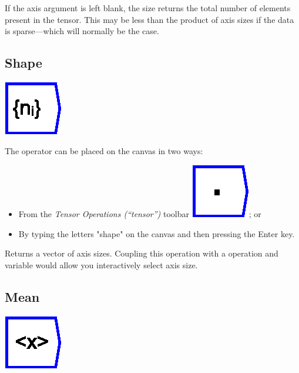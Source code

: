If the axis argument is left blank, the size returns the total number
of elements present in the tensor. This may be less than the product
of axis sizes if the data is sparse---which will normally be the
case.

\subsection{Shape}

\label{Operation:shape}

\includegraphics{images/shape}

The operator can be placed on the canvas in two ways:
\begin{itemize}
\item From the \emph{Tensor Operations (``tensor'')} toolbar \includegraphics{images/innerProduct};
or 
\item By typing the letters "shape" on the canvas and then pressing the
Enter key.
\end{itemize}
Returns a vector of axis sizes. Coupling this operation with a 
operation and variable would allow you interactively select axis size.

\subsection{Mean}

\label{Operation:mean}

\includegraphics{images/mean}

